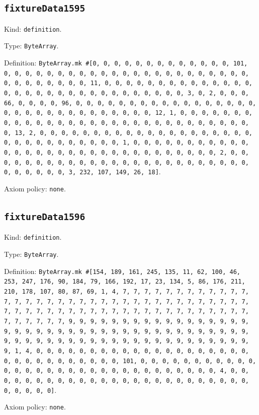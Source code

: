 \documentclass[11pt]{article}
\begin{document}
\subsection*{\texttt{fixtureData1595}}
\noindent Kind: \texttt{definition}.\par
\noindent Type: \texttt{ByteArray}.\par
\noindent Definition: \texttt{ByteArray.mk \#[0, 0, 0, 0, 0, 0, 0, 0, 0, 0, 0, 0, 0, 101, 0, 0, 0, 0, 0, 0, 0, 0, 0, 0, 0, 0, 0, 0, 0, 0, 0, 0, 0, 0, 0, 0, 0, 0, 0, 0, 0, 0, 0, 0, 0, 11, 0, 0, 0, 0, 0, 0, 0, 0, 0, 0, 0, 0, 0, 0, 0, 0, 0, 0, 0, 0, 0, 0, 0, 0, 0, 0, 0, 0, 0, 0, 0, 3, 0, 2, 0, 0, 0, 66, 0, 0, 0, 0, 96, 0, 0, 0, 0, 0, 0, 0, 0, 0, 0, 0, 0, 0, 0, 0, 0, 0, 0, 0, 0, 0, 0, 0, 0, 0, 0, 0, 0, 0, 0, 0, 12, 1, 0, 0, 0, 0, 0, 0, 0, 0, 0, 0, 0, 0, 0, 0, 0, 0, 0, 0, 0, 0, 0, 0, 0, 0, 0, 0, 0, 0, 0, 0, 0, 13, 2, 0, 0, 0, 0, 0, 0, 0, 0, 0, 0, 0, 0, 0, 0, 0, 0, 0, 0, 0, 0, 0, 0, 0, 0, 0, 0, 0, 0, 0, 0, 0, 1, 0, 0, 0, 0, 0, 0, 0, 0, 0, 0, 0, 0, 0, 0, 0, 0, 0, 0, 0, 0, 0, 0, 0, 0, 0, 0, 0, 0, 0, 0, 0, 2, 0, 0, 0, 0, 0, 0, 0, 0, 0, 0, 0, 0, 0, 0, 0, 0, 0, 0, 0, 0, 0, 0, 0, 0, 0, 0, 0, 0, 0, 0, 0, 3, 232, 107, 149, 26, 18]}.\par
\noindent Axiom policy: \texttt{none}.\par
\subsection*{\texttt{fixtureData1596}}
\noindent Kind: \texttt{definition}.\par
\noindent Type: \texttt{ByteArray}.\par
\noindent Definition: \texttt{ByteArray.mk \#[154, 189, 161, 245, 135, 11, 62, 100, 46, 253, 247, 176, 90, 184, 79, 166, 192, 17, 23, 134, 5, 86, 176, 211, 210, 178, 107, 80, 87, 69, 1, 4, 7, 7, 7, 7, 7, 7, 7, 7, 7, 7, 7, 7, 7, 7, 7, 7, 7, 7, 7, 7, 7, 7, 7, 7, 7, 7, 7, 7, 7, 7, 7, 7, 7, 7, 7, 7, 7, 7, 7, 7, 7, 7, 7, 7, 7, 7, 7, 7, 7, 7, 7, 7, 7, 7, 7, 7, 7, 7, 7, 7, 7, 7, 7, 7, 9, 9, 9, 9, 9, 9, 9, 9, 9, 9, 9, 9, 9, 9, 9, 9, 9, 9, 9, 9, 9, 9, 9, 9, 9, 9, 9, 9, 9, 9, 9, 9, 9, 9, 9, 9, 9, 9, 9, 9, 9, 9, 9, 9, 9, 9, 9, 9, 9, 9, 9, 9, 9, 9, 9, 9, 9, 9, 9, 9, 9, 9, 9, 9, 1, 4, 0, 0, 0, 0, 0, 0, 0, 0, 0, 0, 0, 0, 0, 0, 0, 0, 0, 0, 0, 0, 0, 0, 0, 0, 0, 0, 0, 0, 0, 0, 0, 101, 0, 0, 0, 0, 0, 0, 0, 0, 0, 0, 0, 0, 0, 0, 0, 0, 0, 0, 0, 0, 0, 0, 0, 0, 0, 0, 0, 0, 0, 0, 0, 4, 0, 0, 0, 0, 0, 0, 0, 0, 0, 0, 0, 0, 0, 0, 0, 0, 0, 0, 0, 0, 0, 0, 0, 0, 0, 0, 0, 0, 0, 0]}.\par
\noindent Axiom policy: \texttt{none}.\par
\end{document}
